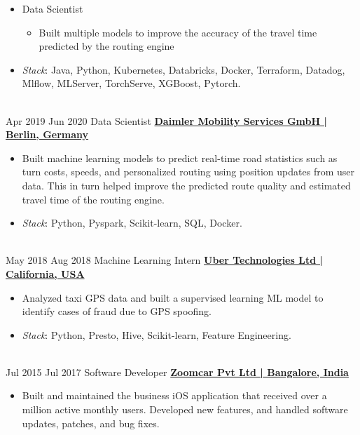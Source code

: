 \documentclass[letterpaper]{DS_class_file} %
\begin{document}
\begin{twenty}
{\begin{itemize}
\begin{itemize}
            \end{itemize}
        \item Data Scientist
            \begin{itemize}
             \item Built multiple models to improve the accuracy of the travel time predicted by the routing engine
            \end{itemize}
        \item \textit{Stack}: Java, Python, Kubernetes, Databricks, Docker, Terraform, Datadog, Mlflow, MLServer, TorchServe, XGBoost, Pytorch.
		\end{itemize}}
		\\
	\twentyitem
		{Apr 2019}
		{Jun 2020}
		{\hspace{0.3cm}Data Scientist}
		{\href{https://www.mercedes-benz-mobility.com/en/}{\textbf{Daimler Mobility Services GmbH | Berlin, Germany}}}
		{}
		{\begin{itemize}
			\item Built machine learning models to predict real-time road statistics such as turn costs, speeds, and personalized routing using position updates from user data. This in turn helped improve the predicted route quality and estimated travel time of the routing engine.
            \item \textit{Stack}: Python, Pyspark, Scikit-learn, SQL, Docker.
		\end{itemize}}
		\\
	\twentyitem
		{May 2018}
		{Aug 2018}
		{\hspace{0.3cm}Machine Learning Intern}
		{\href{https://www.uber.com/}{\textbf{Uber Technologies Ltd | California, USA}}}
		{}
		{\begin{itemize}
			\item Analyzed taxi GPS data and built a supervised learning ML model to identify cases of fraud due to GPS spoofing.
            \item \textit{Stack}: Python, Presto, Hive, Scikit-learn, Feature Engineering.
		\end{itemize}}
		\\
	\twentyitem
		{Jul 2015}
		{Jul 2017}
		{\hspace{0.3cm}Software Developer}
		{\href{http://www.organonanalytics.com/pages/index.php}{\textbf{Zoomcar Pvt Ltd | Bangalore, India}}}
		{}
		{\begin{itemize}
			\item Built and maintained the business iOS application that received over a million active monthly users. Developed new features, and handled software updates, patches, and bug fixes.

\end{itemize}}
\end{twenty}
\end{document}
